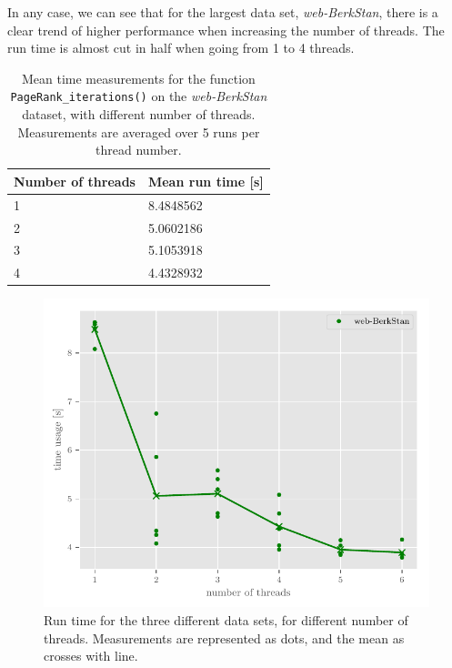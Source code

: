 \documentclass[10pt, a4paper]{amsart}
\numberwithin{figure}{section}
\numberwithin{table}{section}
\begin{document}
In any case, we can see that for the largest data set, \textit{web-BerkStan}, there is a clear trend of higher performance when increasing the number of threads. The run time is almost cut in half when going from 1 to 4 threads.

\begin{table}[H]
    \caption{Mean time measurements for the function \texttt{PageRank\_iterations()} on the \textit{web-BerkStan} dataset, with different number of threads. Measurements are averaged over 5 runs per thread number.}
    \label{tab:timing_parallel}
    \begin{tabular}{ll}
        Number of threads & Mean run time [s] \\
        \hline
        1 & 8.4848562 \\
        2 & 5.0602186 \\
        3 & 5.1053918 \\
        4 & 4.4328932 \\
    \end{tabular}
\end{table}

\begin{figure}
    \includegraphics{../runtime.pdf}
    \caption{Run time for the three different data sets, for different number of threads. Measurements are represented as dots, and the mean as crosses with line.}
    \label{fig:timing_parallel}
\end{figure}
\end{document}
